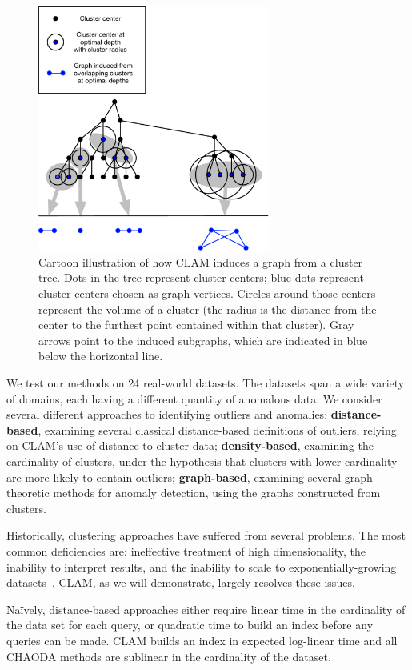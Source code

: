 \begin{figure}[ht!]
    \centering
    \includegraphics[width=3in]{images/tree-graph.pdf}
    \caption{Cartoon illustration of how CLAM induces a graph from a cluster tree.
        Dots in the tree represent cluster centers;
        blue dots represent cluster centers chosen as graph vertices.
        Circles around those centers represent the volume of a cluster (the radius is the distance from the center to the furthest point contained within that cluster).
        Gray arrows point to the induced subgraphs, which are indicated in blue below the horizontal line.}
    \label{fig:introduction:graph-generation}
\end{figure}

We test our methods on 24 real-world datasets.
The datasets span a wide variety of domains, each having a different quantity of anomalous data.
We consider several different approaches to identifying outliers and anomalies:
\textbf{distance-based}, examining several classical distance-based definitions of outliers, relying on CLAM's use of distance to cluster data;
\textbf{density-based}, examining the cardinality of clusters, under the hypothesis that clusters with lower cardinality are more likely to contain outliers;
\textbf{graph-based}, examining several graph-theoretic methods for anomaly detection, using the graphs constructed from clusters.

Historically, clustering approaches have suffered from several problems.
The most common deficiencies are: ineffective treatment of high dimensionality, the inability to interpret results, and the inability to scale to exponentially-growing datasets~\cite{agrawal1998automatic}.
CLAM, as we will demonstrate, largely resolves these issues.

Na\"ively, distance-based approaches either require linear time in the cardinality of the data set for each query,
or quadratic time to build an index before any queries can be made.
CLAM builds an index in expected log-linear time and all CHAODA methods are sublinear in the cardinality of the dataset.
